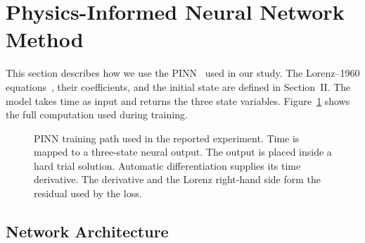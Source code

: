 \section{Physics-Informed Neural Network Method}
\label{sec:pinn-method}

This section describes how we use the PINN~\cite{raissi2019} used in our study. The Lorenz--1960 equations~\cite{lorenz1960},
their coefficients, and the initial state are defined in Section~II. The model
takes time as input and returns the three state variables. Figure~\ref{fig:pinn-pipeline}
shows the full computation used during training.

\begin{figure}[htbp]
    \centering
    \caption{PINN training path used in the reported experiment. Time is mapped
    to a three-state neural output. The output is placed inside a hard trial
    solution. Automatic differentiation supplies its time derivative. The
    derivative and the Lorenz right-hand side form the residual used by the loss.}
    \label{fig:pinn-pipeline}
\end{figure}
\FloatBarrier

\subsection{Network Architecture}

